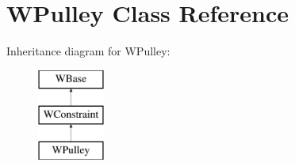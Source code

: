 \hypertarget{class_w_pulley}{}\section{W\+Pulley Class Reference}
\label{class_w_pulley}
Inheritance diagram for W\+Pulley\+:\begin{figure}[H]
\begin{center}
\leavevmode
\includegraphics[height=3.000000cm]{class_w_pulley}
\end{center}
\end{figure}
